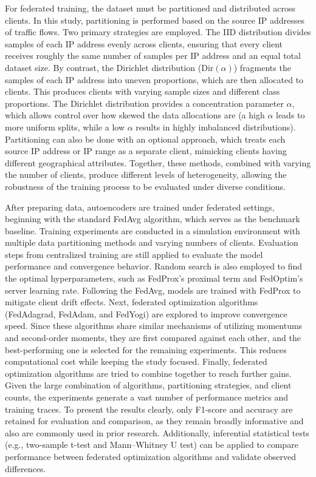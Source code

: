 For federated training, the dataset must be partitioned and distributed across clients. In this study, partitioning is performed based on the source IP addresses of traffic flows. Two primary strategies are employed. The IID distribution divides samples of each IP address evenly across clients, ensuring that every client receives roughly the same number of samples per IP address and an equal total dataset size. By contrast, the Dirichlet distribution ($\text{Dir}(\alpha)$) fragments the samples of each IP address into uneven proportions, which are then allocated to clients. This produces clients with varying sample sizes and different class proportions. The Dirichlet distribution provides a concentration parameter $\alpha$, which allows control over how skewed the data allocations are (a high $\alpha$ leads to more uniform splits, while a low $\alpha$ results in highly imbalanced distributions). Partitioning can also be done with an optional approach, which treats each source IP address or IP range as a separate client, mimicking clients having different geographical attributes. Together, these methods, combined with varying the number of clients, produce different levels of heterogeneity, allowing the robustness of the training process to be evaluated under diverse conditions.

After preparing data, autoencoders are trained under federated settings, beginning with the standard FedAvg algorithm, which serves as the benchmark baseline. Training experiments are conducted in a simulation environment with multiple data partitioning methods and varying numbers of clients. Evaluation steps from centralized training are still applied to evaluate the model performance and convergence behavior. Random search is also employed to find the optimal hyperparameters, such as FedProx's proximal term and FedOptim's server learning rate. Following the FedAvg, models are trained with FedProx to mitigate client drift effects. Next, federated optimization algorithms (FedAdagrad, FedAdam, and FedYogi) are explored to improve convergence speed. Since these algorithms share similar mechanisms of utilizing momentums and second-order moments, they are first compared against each other, and the best-performing one is selected for the remaining experiments. This reduces computational cost while keeping the study focused. Finally, federated optimization algorithms are tried to combine together to reach further gains. Given the large combination of algorithms, partitioning strategies, and client counts, the experiments generate a vast number of performance metrics and training traces. To present the results clearly, only F1-score and accuracy are retained for evaluation and comparison, as they remain broadly informative and also are commonly used in prior research. Additionally, inferential statistical tests (e.g., two-sample t-test and Mann–Whitney U test) can be applied to compare performance between federated optimization algorithms and validate observed differences.

